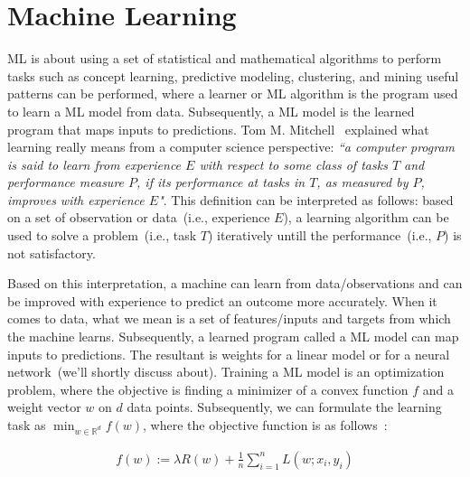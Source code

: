 \section{Machine Learning}
ML is about using a set of statistical and mathematical algorithms to perform tasks such as concept learning, predictive modeling, clustering, and mining useful patterns can be performed, where a learner or ML algorithm is the program used to learn a ML model from data. Subsequently, a ML model is the learned program that maps inputs to predictions. Tom M. Mitchell~\cite{mitchell1997machine} explained what learning really means from a computer science perspective: \textit{``a computer program is said to learn from experience $E$ with respect to some class of tasks $T$ and performance measure $P$, if its performance at tasks in $T$, as measured by $P$, improves with experience $E$"}. This definition can be interpreted as follows: based on a set of observation or data~(i.e., experience $E$), a learning algorithm can be used to solve a problem~(i.e., task $T$) iteratively untill the performance~(i.e., $P$) is not satisfactory. 

\hspace*{3.5mm}Based on this interpretation, a machine can learn from data/observations and can be improved with experience to predict an outcome more accurately. When it comes to data, what we mean is a set of features/inputs and targets from which the machine learns. Subsequently, a learned program called a ML model can map inputs to predictions. The resultant is weights for a linear model or for a neural network~(we'll shortly discuss about). Training a ML model is an optimization problem, where the objective is finding a minimizer of a convex function $f$ and a weight vector $w$ on $d$ data points. Subsequently, we can formulate the learning task as $\min _{w \in \mathbb{R}^{d}} f(w)$, where the objective function is as follows~\cite{karim2018scala}:

\vspace{-4mm}
\begin{align}
    f(w):=\lambda R(w)+\frac{1}{n} \sum_{i=1}^{n} L\left(w ; x_{i}, y_{i}\right)
\end{align}

